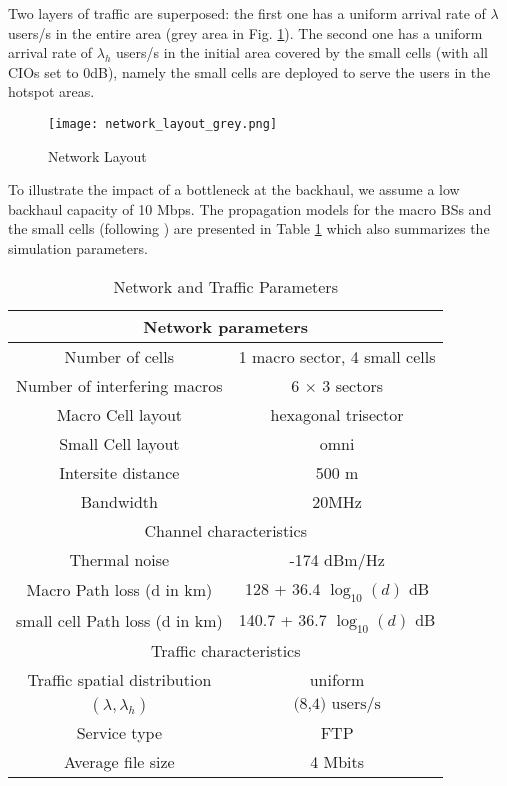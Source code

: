 \documentclass[10pt,draftclsnofoot,onecolumn]{IEEEtran}
\begin{document}
    Two layers of traffic are superposed: the first one has a uniform
arrival rate of $\lambda$ users/s in the entire area (grey area in
Fig. \ref{fig:net_lay}). The second one has a uniform arrival rate
of $\lambda_h$ users/s in the initial area covered by the small
cells (with all \acp{CIO} set to 0dB), namely the small cells are
deployed to serve the users in the hotspot areas.

\begin{figure}[!ht]
\centering
\texttt{[image: network\_layout\_grey.png]}
\caption{Network Layout} \label{fig:net_lay}
\end{figure}

    To illustrate the impact of a bottleneck at the backhaul,
we assume a low backhaul capacity of 10 Mbps. The propagation models
for the macro \acp{BS} and the small cells (following \cite[Page
61]{3gpp_evolveduniversalterrestrial_2010}) are presented in Table
\ref{tab:params} which also summarizes the simulation parameters.

\begin{table}[!t]
\renewcommand{\arraystretch}{1.3}
\caption{Network and Traffic Parameters} \label{tab:params}
\centering
\begin{tabular}{|c|c|}
\hline
\multicolumn{2}{|c|}{Network parameters} \\
\hline
Number of cells & 1 macro sector, 4 small cells \\
\hline
Number of interfering macros & 6 $\times$ 3 sectors \\
\hline
Macro Cell layout & hexagonal trisector \\
\hline
Small Cell layout & omni \\
\hline
Intersite distance & 500 m \\
\hline
Bandwidth & 20MHz \\
\hline
\multicolumn{2}{|c|}{Channel characteristics} \\
\hline
Thermal noise & -174 dBm/Hz \\
\hline
Macro Path loss (d in km) & 128 + 36.4 $\log_{10}(d)$ dB \\
\hline
small cell Path loss (d in km) & 140.7 + 36.7 $\log_{10}(d)$ dB \\
\hline
\multicolumn{2}{|c|}{Traffic characteristics} \\
\hline
Traffic spatial distribution & uniform \\
\hline
$(\lambda, \lambda_h)$ & $\text{(8,4) users/s}$ \\
\hline
Service type & FTP \\
\hline
Average file size & 4 Mbits \\
\hline
\end{tabular}
\end{table}
\end{document}
